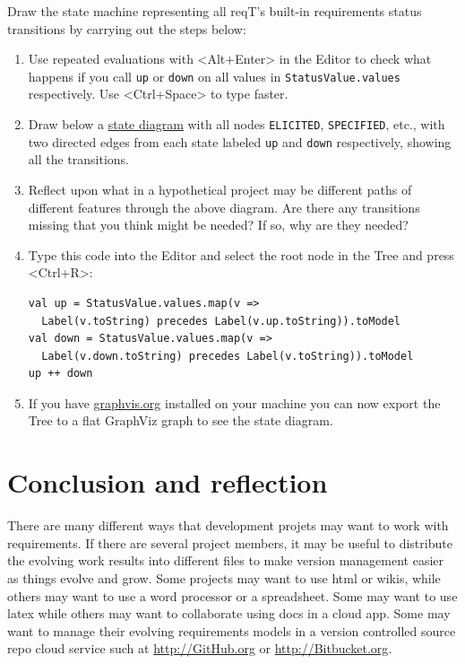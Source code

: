 \documentclass[11pt]{article}
\begin{document}
\newpage %
\begin{framed}
\noindent Draw the state machine representing all reqT's built-in requirements status transitions by carrying out the steps below:
\begin{enumerate}
\item Use repeated evaluations with <Alt+Enter> in the Editor to check what happens if you call \verb+up+ or  \verb+down+ on all values in \verb+StatusValue.values+ respectively. Use <Ctrl+Space> to type faster. 
\item Draw below a \href{http://en.wikipedia.org/wiki/State_diagram}{state diagram} with all nodes \verb+ELICITED+, \verb+SPECIFIED+, etc., with two directed edges from each state labeled \verb+up+ and \verb+down+ respectively, showing all the transitions. \newline
\vspace{7cm}
\item Reflect upon what in a hypothetical project may be different paths of different features through the above diagram. Are there any transitions missing that you think might be needed? If so, why are they needed?
\item Type this code into the Editor and select the root node in the Tree and press <Ctrl+R>:{\scriptsize\begin{verbatim}
val up = StatusValue.values.map(v => 
  Label(v.toString) precedes Label(v.up.toString)).toModel
val down = StatusValue.values.map(v => 
  Label(v.down.toString) precedes Label(v.toString)).toModel
up ++ down
\end{verbatim}}
\item If you have \url{graphvis.org} installed on your machine you can now export the Tree to a flat GraphViz graph to see the state diagram.
\end{enumerate}
\end{framed}


\section{Conclusion and reflection}

There are many different ways that development projets may want to work with requirements. If there are several project members, it may be useful to distribute the evolving work results into different files to make version management easier as things evolve and grow. Some projects may want to use html or wikis, while others may want to use a word processor or a spreadsheet. Some may want to use latex while others may want to collaborate using docs in a cloud app. Some may want to manage their evolving requirements models in a version controlled source repo cloud service such at \url{http://GitHub.org} or \url{http://Bitbucket.org}. 
\end{document}
